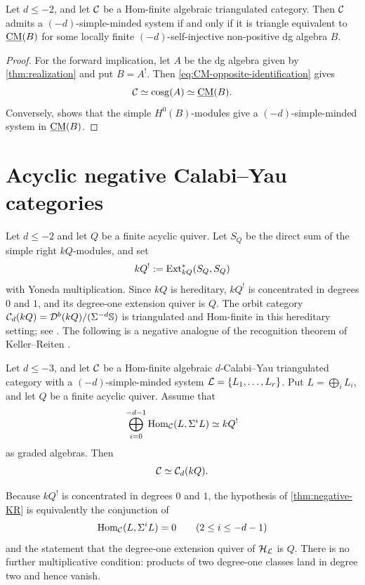 \documentclass[11pt,a4paper,dvipsnames,x11names]{amsart}
\begin{document}
\begin{cor}\label{cor:CM-characterization}
Let $d\leq-2$, and let $\mathcal C$ be a Hom-finite algebraic triangulated category. Then $\mathcal C$ admits a $(-d)$-simple-minded system if and only if it is triangle equivalent to $\underline{\operatorname{CM}}(B)$ for some locally finite $(-d)$-self-injective non-positive dg algebra $B$.
\end{cor}
\begin{proof}
For the forward implication, let $A$ be the dg algebra given by \cref{thm:realization} and put $B=A^!$. Then \eqref{eq:CM-opposite-identification} gives
\[
\mathcal C\simeq\operatorname{cosg}(A)\simeq\underline{\operatorname{CM}}(B).
\]
Conversely, \cite[Theorem~5.6]{Jin20} shows that the simple $H^0(B)$-modules give a $(-d)$-simple-minded system in $\underline{\operatorname{CM}}(B)$.
\end{proof}


\section{Acyclic negative Calabi--Yau categories}\label{sec:acyclic-negative-CY}

Let $d\leq-2$ and let $Q$ be a finite acyclic quiver. Let $S_Q$ be the direct sum of the simple right $kQ$-modules, and set
\[
kQ^!:=\operatorname{Ext}^*_{kQ}(S_Q,S_Q)
\]
with Yoneda multiplication. Since $kQ$ is hereditary, $kQ^!$ is concentrated in degrees $0$ and $1$, and its degree-one extension quiver is $Q$. The orbit category $\mathcal C_d(kQ)=\mathcal D^b(kQ)/(\Sigma^{-d}\mathbb S)$ is triangulated and Hom-finite in this hereditary setting; see \cite{Keller05,CoelhoPauksztelloPloog22}. The following is a negative analogue of the recognition theorem of Keller--Reiten \cite{KR08}.

\begin{thm}\label{thm:negative-KR}
Let $d\leq-3$, and let $\mathcal C$ be a Hom-finite algebraic $d$-Calabi--Yau triangulated category with a $(-d)$-simple-minded system $\mathcal L=\{L_1,\dots,L_r\}$. Put $L=\bigoplus_iL_i$, and let $Q$ be a finite acyclic quiver. Assume that
\[
\bigoplus_{i=0}^{-d-1}\operatorname{Hom}_{\mathcal C}(L,\Sigma^iL)\simeq kQ^!
\]
as graded algebras. Then
\[
\mathcal C\simeq\mathcal C_d(kQ).
\]
\end{thm}

\begin{rmk}\label{rmk:KR-hypothesis}
Because $kQ^!$ is concentrated in degrees $0$ and $1$, the hypothesis of \cref{thm:negative-KR} is equivalently the conjunction of
\[
\operatorname{Hom}_\mathcal C(L,\Sigma^iL)=0\qquad(2\le i\le-d-1)
\]
and the statement that the degree-one extension quiver of $\mathcal H_{\mathcal L}$ is $Q$. There is no further multiplicative condition: products of two degree-one classes land in degree two and hence vanish.
\end{rmk}
\end{document}
